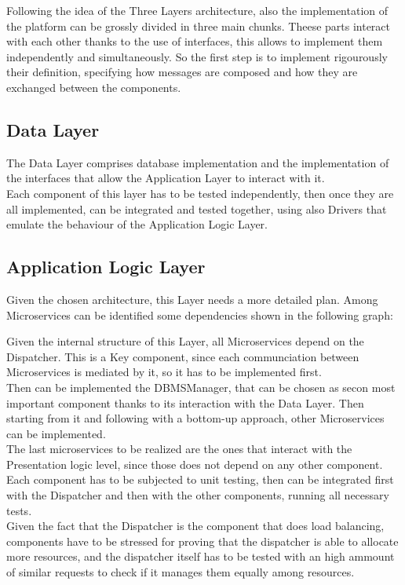 Following the idea of the Three Layers architecture, also the implementation of the platform can be grossly divided in three main chunks.
Theese parts interact with each other thanks to the use of interfaces, this allows to implement them independently and simultaneously. So the first step is to implement rigourously their definition, specifying how messages are composed and how they are exchanged between the components.\\

\subsection{Data Layer}
The Data Layer comprises database implementation and the implementation of the interfaces that allow the Application Layer to interact with it.\\
Each component of this layer has to be tested independently, then once they are all implemented, can be integrated and tested together, using also Drivers that emulate the behaviour of the Application Logic Layer.\\
\subsection{Application Logic Layer}
Given the chosen architecture, this Layer needs a more detailed plan. Among Microservices can be identified some dependencies shown in the following graph:

\useSvgWithCaption{}{}{}{}

Given the internal structure of this Layer, all Microservices depend on the Dispatcher. This is a Key component, since each communciation between Microservices is mediated by it, so it has to be implemented first.\\
Then can be implemented the DBMSManager, that can be chosen as secon most important component thanks to its interaction with the Data Layer. Then starting from it and following with a bottom-up approach, other Microservices can be implemented.\\
The last microservices to be realized are the ones that interact with the Presentation logic level, since those does not depend on any other component.\\
Each component has to be subjected to unit testing, then can be integrated first with the Dispatcher and then with the other components, running all necessary tests.\\
Given the fact that the Dispatcher is the component that does load balancing, components have to be stressed for proving that the dispatcher is able to allocate more resources, and the dispatcher itself has to be tested with an high ammount of similar requests to check if it manages them equally among resources.\\

